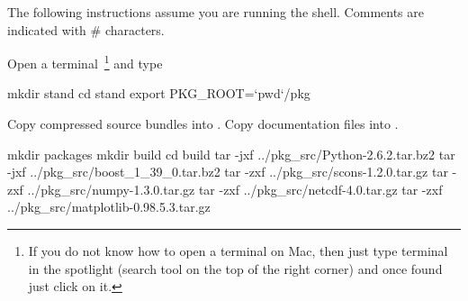The following instructions assume you are running the  shell.
Comments are indicated with \# characters. 

Open a terminal~\footnote{If you do not know how to open a terminal on Mac, then just type terminal in the spotlight (search tool on the top of the right corner) and once found just click on it.} and type

\begin{shellCode}
mkdir stand
cd stand
export PKG_ROOT=`pwd`/pkg
\end{shellCode}

Copy compressed source bundles into .
Copy documentation files into .

\begin{shellCode}
mkdir packages
mkdir build
cd build
tar -jxf ../pkg_src/Python-2.6.2.tar.bz2
tar -jxf ../pkg_src/boost_1_39_0.tar.bz2
tar -zxf ../pkg_src/scons-1.2.0.tar.gz
tar -zxf ../pkg_src/numpy-1.3.0.tar.gz
tar -zxf ../pkg_src/netcdf-4.0.tar.gz
tar -zxf ../pkg_src/matplotlib-0.98.5.3.tar.gz
\end{shellCode}

